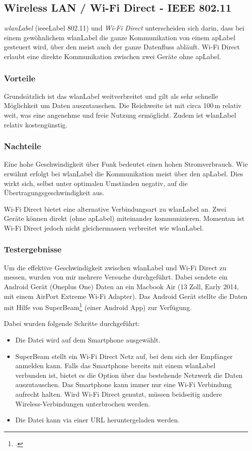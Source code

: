 \subsection{Wireless LAN / Wi-Fi Direct - IEEE 802.11}
\textit{\gls{wlanLabel}} (\gls{ieeeLabel} 802.11) und \textit{Wi-Fi Direct} unterscheiden sich darin, dass bei einem gewöhnlichem \gls{wlanLabel} die ganze Kommunikation von einem \gls{apLabel} gesteuert wird, über den meist auch der ganze Datenfluss abläuft.
Wi-Fi Direct erlaubt eine direkte Kommunikation zwischen zwei Geräte ohne \gls{apLabel}.

\subsubsection{Vorteile}
Grundsätzlich ist das \gls{wlanLabel} weitverbreitet und gilt als sehr schnelle Möglichkeit um Daten auszutauschen.
Die Reichweite ist mit circa 100\,m relativ weit, was eine angenehme und freie Nutzung ermöglicht.
Zudem ist \gls{wlanLabel} relativ kostengünstig.

\subsubsection{Nachteile}
Eine hohe Geschwindigkeit über Funk bedeutet einen hohen Stromverbrauch.
Wie erwähnt erfolgt bei \gls{wlanLabel} die Kommunikation meist über den \gls{apLabel}.
Dies wirkt sich, selbst unter optimalen Umständen negativ, auf die Übertragungsgeschwindigkeit aus.

Wi-Fi Direct bietet eine alternative Verbindungsart zu \gls{wlanLabel} an. Zwei Geräte können direkt (ohne \gls{apLabel}) miteinander kommunizieren.
Momentan ist Wi-Fi Direct jedoch nicht gleichermassen verbreitet wie \gls{wlanLabel}.

\subsubsection{Testergebnisse}
Um die effektive Geschwindigkeit zwischen \gls{wlanLabel} und Wi-Fi Direct zu messen, wurden von mir mehrere Versuche durchgeführt.
Dabei sendete ein Android Gerät (Oneplus One) Daten an ein Macbook Air (13 Zoll, Early 2014, mit einem AirPort Extreme Wi-Fi Adapter).
Das Android Gerät stellte die Daten mit Hilfe von SuperBeam\footcite{SuperBeam_WiFi_Direct_Share_Android_Apps_on_Google_Play_2015-05-22} (einer Android App) zur Verfügung.

Dabei wurden folgende Schritte durchgeführt:
\begin{itemize}
	\item Die Datei wird auf dem Smartphone ausgewählt.
	\item SuperBeam stellt ein Wi-Fi Direct Netz auf, bei dem sich der Empfänger anmelden kann. Falls das Smartphone bereits mit einem \gls{wlanLabel} verbunden ist, bietet es die Option über das bestehende Netzwerk die Daten auszutauschen.
	Das Smartphone kann immer nur eine Wi-Fi Verbindung aufrecht halten.
	Wird Wi-Fi Direct genutzt, müssen beidseitig andere Wireless-Verbindungen unterbrochen werden.
	\item Die Datei kann via einer URL heruntergeladen werden.
\end{itemize}

